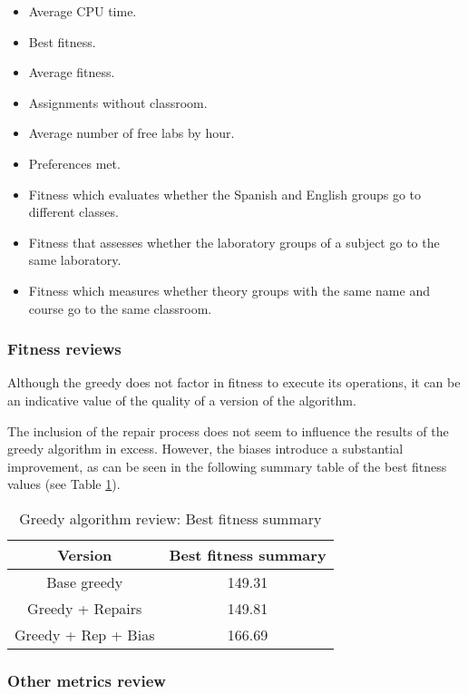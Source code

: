\begin{itemize}
    \item Average CPU time.
    \item Best fitness.
    \item Average fitness. 
    \item Assignments without classroom. 
    \item Average number of free labs by hour.
    \item Preferences met. 
    \item Fitness which evaluates whether the Spanish and English groups go to different classes.  
    \item Fitness that assesses whether the laboratory groups of a subject go to the same laboratory.
    \item Fitness which measures whether theory groups with the same name and course go to the same classroom.
\end{itemize}


\subsubsection{Fitness reviews}

Although the greedy does not factor in fitness to execute its operations, it can be an indicative value of the quality of a version of the algorithm.

The inclusion of the repair process does not seem to influence the results of the greedy algorithm in excess. However, the biases introduce a substantial improvement, as can be seen in the following summary table of the best fitness values (see Table \ref{table-fn-review}).


\begin{table}[H]
    \centering
    \caption{Greedy algorithm review: Best fitness summary}
    \label{table-fn-review}
    \begin{tabular}{|c|c|}
        \hline
        \textbf{Version} & \textbf{Best fitness summary} \\
        \hline
        \rowcolor{blue!30}
        Base greedy & 149.31 \\
        \rowcolor{blue!10}
        Greedy + Repairs & 149.81 \\
        \rowcolor{blue!30}
        Greedy + Rep + Bias & 166.69 \\
        \hline
    \end{tabular}
\end{table}


\subsubsection{Other metrics review}


